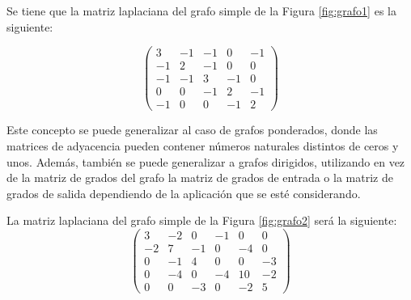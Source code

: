 \begin{exampleth}
Se tiene que la matriz laplaciana del grafo simple de la Figura \ref{fig:grafo1} es la siguiente:

\begin{equation}
\begin{pmatrix}
3 & -1 & -1 & 0 & -1\\
-1 & 2 & -1 & 0 & 0\\
-1 & -1 & 3 & -1 & 0\\
0 & 0 & -1 & 2 & -1\\
-1 & 0 & 0 & -1 & 2
\end{pmatrix}
\end{equation}
\end{exampleth}

Este concepto se puede generalizar al caso de grafos ponderados, donde las matrices de adyacencia pueden contener números naturales distintos de ceros y unos. Además, también se puede generalizar a grafos dirigidos, utilizando en vez de la matriz de grados del grafo la matriz de grados de entrada o la matriz de grados de salida dependiendo de la aplicación que se esté considerando.

\begin{exampleth}
La matriz laplaciana del grafo simple de la Figura \ref{fig:grafo2} será la siguiente:
\begin{equation}
\begin{pmatrix}
3 & -2 & 0 & -1 & 0 & 0\\
-2 & 7 & -1 & 0 & -4 & 0\\
0 & -1 & 4 & 0 & 0 & -3\\
0 & -4 & 0 & -4 & 10 & -2\\
0 & 0 & -3 & 0 & -2 & 5
\end{pmatrix}
\end{equation}
\end{exampleth}

